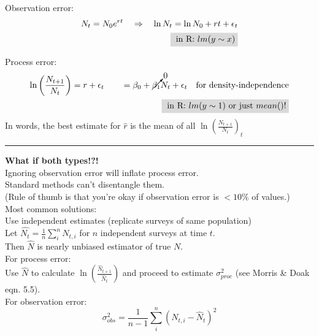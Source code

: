 \documentclass{article}
\newcommand{\note}[1]{\colorbox{gray!30}{#1}}
\newcommand{\ind}{\-\hspace{1cm}}
\newcommand*\circled[1]{\tikz[baseline=(char.base)]{
            \node[shape=circle,draw,inner sep=2pt] (char) {#1};}}
\begin{document}
Observation error:
\begin{align*}
	N_t=N_0 e^{rt} \quad \Rightarrow \quad \ln{N_t}=\ln{N_0}+rt+\epsilon_t \\
	\note{ in R: $lm(y\sim x)$}
\end{align*}

Process error:
\begin{align*}
	\ln\left(\frac{N_{t+1}}{N_t}\right) = r + \epsilon_t \quad \quad = \beta_0 + \cancelto{0}{\beta_1} N_t + \epsilon_t \quad \text{for density-independence}\\
	\note{ in R: $lm(y\sim 1)$ or just $mean$()!}
\end{align*}
\ind In words, the best estimate for $\hat{r}$ is the mean of all $\ln\left(\frac{N_{t+1}}{N_t}\right)_t$

\rule[0.5ex]{\linewidth}{1pt}
\textbf{What if both types!?!}\\
Ignoring observation error will inflate process error.\\
Standard methods can't disentangle them.\\
\ind (Rule of thumb is that you're okay if observation error is $<10\%$ of values.)\\

Most common solutions:\\

\circled{1} Use independent estimates (replicate surveys of same population)\\
Let $\hat{N_t} = \frac{1}{n}\sum_i^n N_{t,i}$ for $n$ independent surveys at time $t$.\\
\ind Then $\hat{N}$ is nearly unbiased estimator of true $N$.\\
For process error:\\
\ind Use $\hat{N}$ to calculate $\ln\left(\frac{\hat{N}_{t+1}}{\hat{N}_t}\right)$ and proceed to estimate $\sigma_{proc}^2$ (see Morris \& Doak eqn. 5.5).\\
For observation error:\\
\begin{equation*}
	\sigma_{obs}^2 = \frac{1}{n-1}\sum_i^n \left(N_{t,i}-\hat{N}_t\right)^2
\end{equation*}
\end{document}
